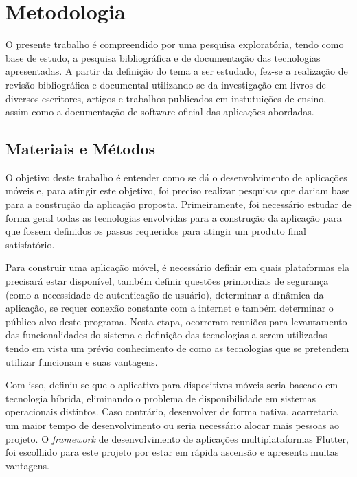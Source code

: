 
\chapter{Metodologia}\label{ch:metodologia}

O presente trabalho é compreendido por uma pesquisa exploratória, tendo como base de estudo, a pesquisa bibliográfica e de documentação das tecnologias apresentadas.
A partir da definição do tema a ser estudado, fez-se a realização de revisão bibliográfica e documental utilizando-se da investigação em livros de diversos escritores, artigos e trabalhos publicados em instutuições de ensino, assim como a documentação de software oficial das aplicações abordadas.


\section{Materiais e Métodos}\label{sec:materiais-e-metodos}

O objetivo deste trabalho é entender como se dá o desenvolvimento de aplicações móveis e, para atingir este objetivo, foi preciso realizar pesquisas que dariam base para a construção da aplicação proposta.
Primeiramente, foi necessário estudar de forma geral todas as tecnologias envolvidas para a construção da aplicação para que fossem definidos os passos requeridos para atingir um produto final satisfatório.

Para construir uma aplicação móvel, é necessário definir em quais plataformas ela precisará estar disponível, também definir questões primordiais de segurança (como a necessidade de autenticação de usuário), determinar a dinâmica da aplicação, se requer conexão constante com a internet e também determinar o público alvo deste programa.
Nesta etapa, ocorreram reuniões para levantamento das funcionalidades do sistema e definição das tecnologias a serem utilizadas tendo em vista um prévio conhecimento de como as tecnologias que se pretendem utilizar funcionam e suas vantagens.

Com isso, definiu-se que o aplicativo para dispositivos móveis seria baseado em tecnologia híbrida, eliminando o problema de disponibilidade em sistemas operacionais distintos.
Caso contrário, desenvolver de forma nativa, acarretaria um maior tempo de desenvolvimento ou seria necessário alocar mais pessoas ao projeto.
O \textit{framework} de desenvolvimento de aplicações multiplataformas Flutter, foi escolhido para este projeto por estar em rápida ascensão e apresenta muitas vantagens.

